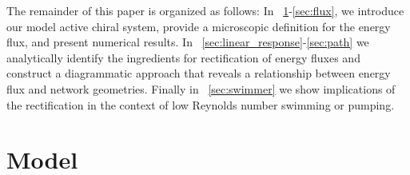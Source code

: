 \documentclass[
 preprint,
 preprintnumbers,
 amsmath,amssymb,
 aps,
 pre,
 longbibliography,
 superscriptaddress,
 10pt, twocolumn
]{revtex4-1}
\begin{document}




The remainder of this paper is organized as follows:
In \secname~\ref{sec:model}-\ref{sec:flux}, we introduce our model active chiral system, provide a microscopic definition for the energy flux, and present numerical results.
In \secname~\ref{sec:linear_response}-\ref{sec:path} we analytically identify the ingredients for rectification of energy fluxes and construct a diagrammatic approach that reveals a relationship between energy flux and network geometries.
Finally in \secname~\ref{sec:swimmer} we show implications of the rectification in the context of low Reynolds number swimming or pumping.

\section{Model} \label{sec:model}
\end{document}
